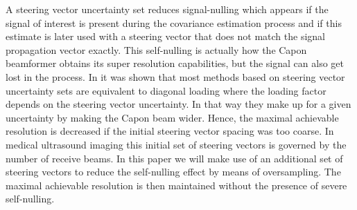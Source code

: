\documentclass[draftcls]{IEEEtran}
\begin{document}

%

A steering vector uncertainty set reduces signal-nulling which appears if the signal of interest is present during the covariance estimation process and if this estimate is later used with a steering vector that does not match the signal propagation vector exactly. This self-nulling is actually how the Capon beamformer obtains its super resolution capabilities, but the signal can also get lost in the process. In \cite{JianLi2003} it was shown that most methods based on steering vector uncertainty sets are equivalent to diagonal loading where the loading factor depends on the steering vector uncertainty. In that way they make up for a given uncertainty by making the Capon beam wider. Hence, the maximal achievable resolution is decreased if the initial steering vector spacing was too coarse. In medical ultrasound imaging this initial set of steering vectors is governed by the number of receive beams. In this paper we will make use of an additional set of steering vectors to reduce the self-nulling effect by means of oversampling. The maximal achievable resolution is then maintained without the presence of severe self-nulling.
\end{document}
